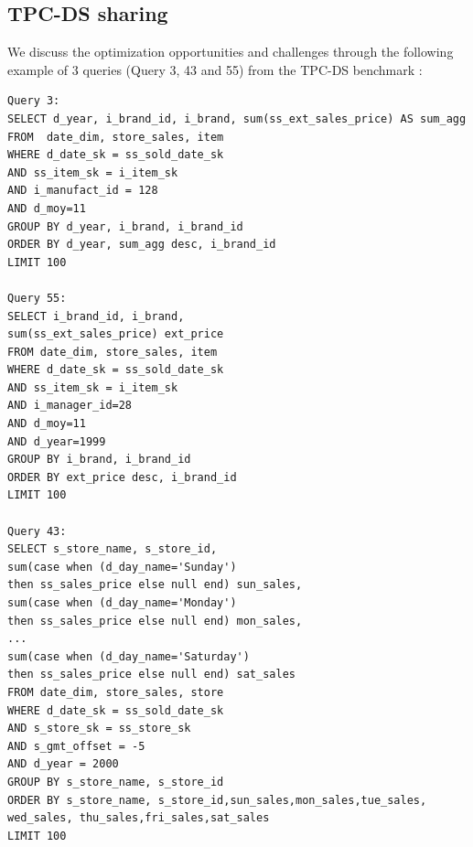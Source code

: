 \subsection{TPC-DS sharing}
\label{sec:tpcds-sharing}

We discuss the optimization opportunities and challenges through the following example of 3 queries (Query 3, 43 and 55) from the TPC-DS benchmark \cite{tpcds}:
\begingroup
\fontsize{6pt}{7pt}
\selectfont
\begin{verbatim}
Query 3:
SELECT d_year, i_brand_id, i_brand, sum(ss_ext_sales_price) AS sum_agg
FROM  date_dim, store_sales, item
WHERE d_date_sk = ss_sold_date_sk
AND ss_item_sk = i_item_sk
AND i_manufact_id = 128
AND d_moy=11
GROUP BY d_year, i_brand, i_brand_id
ORDER BY d_year, sum_agg desc, i_brand_id
LIMIT 100

Query 55:
SELECT i_brand_id, i_brand, 
sum(ss_ext_sales_price) ext_price
FROM date_dim, store_sales, item
WHERE d_date_sk = ss_sold_date_sk
AND ss_item_sk = i_item_sk
AND i_manager_id=28
AND d_moy=11
AND d_year=1999
GROUP BY i_brand, i_brand_id
ORDER BY ext_price desc, i_brand_id
LIMIT 100

Query 43:
SELECT s_store_name, s_store_id, 
sum(case when (d_day_name='Sunday') 
then ss_sales_price else null end) sun_sales,
sum(case when (d_day_name='Monday') 
then ss_sales_price else null end) mon_sales,
...
sum(case when (d_day_name='Saturday') 
then ss_sales_price else null end) sat_sales
FROM date_dim, store_sales, store
WHERE d_date_sk = ss_sold_date_sk 
AND s_store_sk = ss_store_sk
AND s_gmt_offset = -5
AND d_year = 2000
GROUP BY s_store_name, s_store_id
ORDER BY s_store_name, s_store_id,sun_sales,mon_sales,tue_sales,
wed_sales, thu_sales,fri_sales,sat_sales
LIMIT 100
\end{verbatim}
\endgroup

